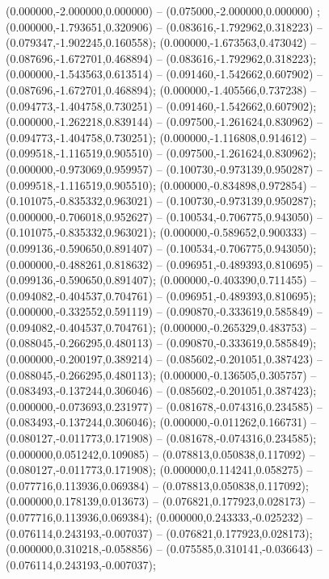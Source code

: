  (0.000000,-2.000000,0.000000) -- (0.075000,-2.000000,0.000000) ;
 (0.000000,-1.793651,0.320906) -- (0.083616,-1.792962,0.318223) -- (0.079347,-1.902245,0.160558);
 (0.000000,-1.673563,0.473042) -- (0.087696,-1.672701,0.468894) -- (0.083616,-1.792962,0.318223);
 (0.000000,-1.543563,0.613514) -- (0.091460,-1.542662,0.607902) -- (0.087696,-1.672701,0.468894);
 (0.000000,-1.405566,0.737238) -- (0.094773,-1.404758,0.730251) -- (0.091460,-1.542662,0.607902);
 (0.000000,-1.262218,0.839144) -- (0.097500,-1.261624,0.830962) -- (0.094773,-1.404758,0.730251);
 (0.000000,-1.116808,0.914612) -- (0.099518,-1.116519,0.905510) -- (0.097500,-1.261624,0.830962);
 (0.000000,-0.973069,0.959957) -- (0.100730,-0.973139,0.950287) -- (0.099518,-1.116519,0.905510);
 (0.000000,-0.834898,0.972854) -- (0.101075,-0.835332,0.963021) -- (0.100730,-0.973139,0.950287);
 (0.000000,-0.706018,0.952627) -- (0.100534,-0.706775,0.943050) -- (0.101075,-0.835332,0.963021);
 (0.000000,-0.589652,0.900333) -- (0.099136,-0.590650,0.891407) -- (0.100534,-0.706775,0.943050);
 (0.000000,-0.488261,0.818632) -- (0.096951,-0.489393,0.810695) -- (0.099136,-0.590650,0.891407);
 (0.000000,-0.403390,0.711455) -- (0.094082,-0.404537,0.704761) -- (0.096951,-0.489393,0.810695);
 (0.000000,-0.332552,0.591119) -- (0.090870,-0.333619,0.585849) -- (0.094082,-0.404537,0.704761);
 (0.000000,-0.265329,0.483753) -- (0.088045,-0.266295,0.480113) -- (0.090870,-0.333619,0.585849);
 (0.000000,-0.200197,0.389214) -- (0.085602,-0.201051,0.387423) -- (0.088045,-0.266295,0.480113);
 (0.000000,-0.136505,0.305757) -- (0.083493,-0.137244,0.306046) -- (0.085602,-0.201051,0.387423);
 (0.000000,-0.073693,0.231977) -- (0.081678,-0.074316,0.234585) -- (0.083493,-0.137244,0.306046);
 (0.000000,-0.011262,0.166731) -- (0.080127,-0.011773,0.171908) -- (0.081678,-0.074316,0.234585);
 (0.000000,0.051242,0.109085) -- (0.078813,0.050838,0.117092) -- (0.080127,-0.011773,0.171908);
 (0.000000,0.114241,0.058275) -- (0.077716,0.113936,0.069384) -- (0.078813,0.050838,0.117092);
 (0.000000,0.178139,0.013673) -- (0.076821,0.177923,0.028173) -- (0.077716,0.113936,0.069384);
 (0.000000,0.243333,-0.025232) -- (0.076114,0.243193,-0.007037) -- (0.076821,0.177923,0.028173);
 (0.000000,0.310218,-0.058856) -- (0.075585,0.310141,-0.036643) -- (0.076114,0.243193,-0.007037);
